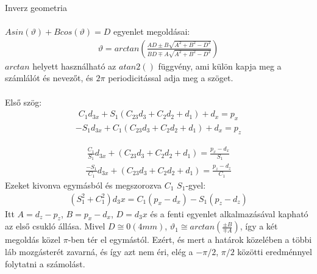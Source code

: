 \documentclass{article}
\begin{document}
	
Inverz geometria\\\\
$A sin(\vartheta)+B cos(\vartheta)=D$ egyenlet megoldásai:
\begin{align*}
\vartheta = arctan \left( \frac{A D\pm B\sqrt{A^2+B^2-D^2}}{B D\mp A\sqrt{A^2+B^2-D^2}} \right)
\end{align*}
$arctan$ helyett használható az $atan2()$ függvény, ami külön kapja meg a számlálót és nevezőt, és $2\pi$ periodicitással adja meg a szöget.\\\\

Első szög:
\begin{align*}
C_1 d_{3x}+S_1 (C_{23} d_3+C_2 d_2+d_1)+d_x=p_x
\end{align*}
\begin{align*}
-S_1 d_{3x}+C_1 (C_{23} d_3+C_2 d_2+d_1)+d_x=p_z
\end{align*}

\begin{align*}
\frac{C_1}{S_1}d_{3x}+(C_{23} d_3+C_2 d_2+d_1)=\frac{p_x-d_x}{S_1}
\end{align*}
\begin{align*}
\frac{-S_1}{C_1}d_{3x}+(C_{23} d_3+C_2 d_2+d_1)=\frac{p_z-d_z}{C_1}
\end{align*}
Ezeket kivonva egymásból és megszorozva $C_1$ $S_1$-gyel:
\begin{align*}
(S_1^2+C_1^2 ) d_3x=C_1 (p_x-d_x )-S_1 (p_z-d_z)
\end{align*}
Itt $A=d_z-p_z$, $B=p_x-d_x$, $D=d_3x$ és a fenti egyenlet alkalmazásával kapható az első csukló állása. Mivel $D\cong0 (4 mm)$, $\vartheta_1\cong arctan\left(\frac{\pm B}{\mp A}\right)$, így a két megoldás közel $\pi$-ben tér el egymástól. Ezért, és mert a határok közelében a többi láb mozgásterét zavarná, és így azt nem éri, elég a $-\pi/2$, $\pi/2$ közötti eredménnyel folytatni a számolást.\\\\
\end{document}
